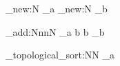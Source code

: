 \documentclass{minimal}
\begin{document}

\ExplSyntaxOn

\digraph_new:N \test_a
\digraph_new:N \test_b

\digraph_add:NnnN \test_a { b } { b } \test_b

\digraph_topological_sort:NN \test_a \typeout

\ExplSyntaxOff

\null
\end{document}
